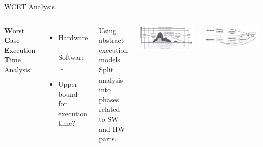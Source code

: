 \documentclass{beamer}
\begin{document}
\begin{frame}{WCET Analysis}
    \begin{columns}
        

    \textbf{W}orst \textbf{C}ase \textbf{E}xecution \textbf{T}ime Analysis:
    \begin{itemize}
        \item Hardware + Software $\downarrow$
        \item Upper bound for execution time?
    \end{itemize}


    \begin{block}{}
        Using abstract execution models. Split analysis into phases related to SW and HW parts.
    \end{block}


    \includegraphics[width=1\textwidth]{pic/timing-distribution.png}

    \includegraphics[width=1\textwidth]{pic/wcet-deps.png}

    \end{columns}
\end{frame}
\end{document}
